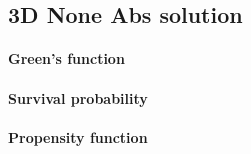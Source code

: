 \subsection{3D None Abs solution}

\paragraph{Green's function}

\paragraph{Survival probability}

\paragraph{Propensity function}
